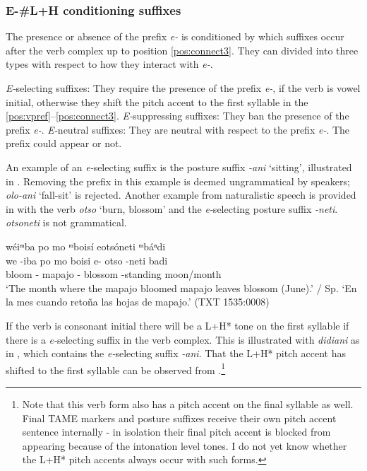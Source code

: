 \documentclass[output=paper,hidelinks]{langscibook}
\begin{document}
\subsubsection{E-\#L+H\* conditioning suffixes}

The presence or absence of the prefix \textit{e-} is conditioned by which suffixes occur after the verb complex up to position \ref{pos:connect3}. They can divided into three types with respect to how they interact with \textit{e-}.

\ea \label{ex:suffixtypes}
    \ea \textit{E-}selecting suffixes: They require the presence of the prefix \textit{e-}, if the verb is vowel initial, otherwise they shift the pitch accent to the first syllable in the \ref{pos:vpref}--\ref{pos:connect3}.
    \ex \textit{E-}suppressing suffixes: They ban the presence of the prefix \textit{e-}.
    \ex \textit{E-}neutral suffixes: They are neutral with respect to the prefix \textit{e-}. The prefix could appear or not. 
    \z
\z

An example of an \textit{e-}selecting suffix is the posture suffix \textit{-ani} `sitting', illustrated in . Removing the prefix in this example is deemed ungrammatical by speakers; \textit{olo-ani} `fall-sit' is rejected. Another example from naturalistic speech is provided in  with the verb \textit{otso} `burn, blossom' and the \textit{e-}selecting posture suffix \textit{-neti}. \textit{otsoneti} is not grammatical.

\ea \label{ex:eotsoneti}
    wéiᵐba po mo ᵐboisí eotsóneti ᵐbáⁿdi \downarrow \\
    \gll we -iba po mo boisi e- otso -neti badi \\
    bloom -\Final{} \Rel{} \Foc{} mapajo \E{}- blossom -standing moon/month  \\
    \glt `The month where the mapajo bloomed mapajo leaves blossom (June).' / Sp. `En la mes cuando retoña las hojas de mapajo.'  \hfill (TXT 1535:0008)
\z 





If the verb is consonant initial there will be a L+H* tone on the first syllable if there is a \textit{e-}selecting suffix in the verb complex. This is illustrated with \textit{didiani} as in , which contains the \textit{e-}selecting suffix \textit{-ani}. That the L+H* pitch accent has shifted to the first syllable can be observed from  .\footnote{Note that this verb form also has a pitch accent on the final syllable as well. Final TAME markers and posture suffixes receive their own pitch accent sentence internally - in isolation their final pitch accent is blocked from appearing because of the intonation level tones. I do not yet know whether the L+H* pitch accents always occur with such forms.}
\end{document}
